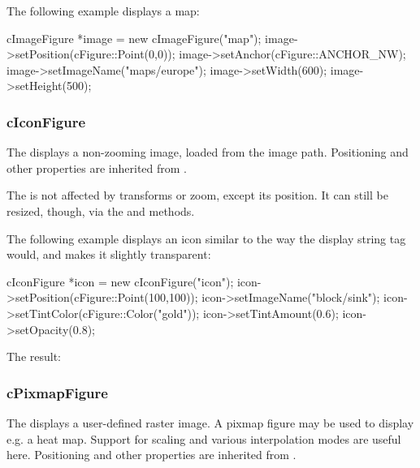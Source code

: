 The following example displays a map:

\begin{cpp}
cImageFigure *image = new cImageFigure("map");
image->setPosition(cFigure::Point(0,0));
image->setAnchor(cFigure::ANCHOR_NW);
image->setImageName("maps/europe");
image->setWidth(600);
image->setHeight(500);
\end{cpp}



\subsubsection{cIconFigure}
\label{sec:graphics:iconfigure}

The  displays a non-zooming image, loaded from the {\opp}
image path. Positioning and other properties are inherited from
.

The  is not affected by transforms or zoom, except its
position. It can still be resized, though, via the  and
 methods.

The following example displays an icon similar to the way the
 display string tag would, and makes it slightly
transparent:

\begin{cpp}
cIconFigure *icon = new cIconFigure("icon");
icon->setPosition(cFigure::Point(100,100));
icon->setImageName("block/sink");
icon->setTintColor(cFigure::Color("gold"));
icon->setTintAmount(0.6);
icon->setOpacity(0.8);
\end{cpp}


The result:

\begin{center}
\end{center}


\subsubsection{cPixmapFigure}
\label{sec:graphics:pixmapfigure}

The  displays a user-defined raster image. A pixmap
figure may be used to display e.g. a heat map. Support for scaling and
various interpolation modes are useful here. Positioning and other
properties are inherited from .

